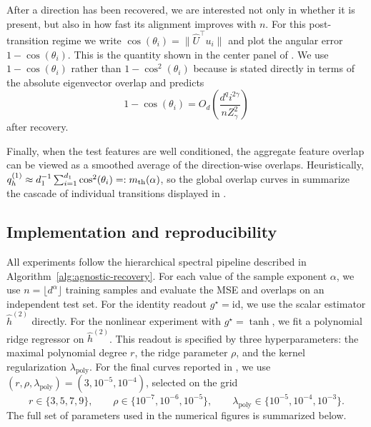 \documentclass[]{article}
\numberwithin{equation}{section}
\theoremstyle{definition}
\begin{document}
After a direction has been recovered, we are interested not only in whether it is present, but also in how fast its alignment improves with $n$. For this post-transition regime we write $\cos(\theta_i)=\|\widehat U^\top u_i\|$ and plot the angular error $1-\cos(\theta_i)$. This is the quantity shown in the center panel of . We use $1-\cos(\theta_i)$ rather than $1-\cos^2(\theta_i)$ because  is stated directly in terms of the absolute eigenvector overlap and predicts
\begin{equation}
    1-\cos(\theta_i)
    =
    O_d\left(\frac{d^q i^{2\gamma}}{nZ_\gamma^2}\right)
\end{equation}
after recovery. 

Finally, when the test features are well conditioned, the aggregate feature overlap can be viewed as a smoothed average of the direction-wise overlaps. Heuristically,
$q_h^{(1)}\approx d_1^{-1}\sum_{i=1}^{d_1}\cos^2(\theta_i)=:m_{\rm th}(\alpha)$, so the global overlap curves in  summarize the cascade of individual transitions displayed in .

\subsection{Implementation and reproducibility}
\label{app:implementation}


All experiments follow the hierarchical spectral pipeline described in Algorithm~\ref{alg:agnostic-recovery}. 
For each value of the sample exponent $\alpha$, we use $n=\lfloor d^\alpha\rfloor$ training samples and evaluate the MSE and overlaps on an independent test set. 
For the identity readout $g^\star=\mathrm{id}$, we use the scalar estimator $\widehat h^{(2)}$ directly. 
For the nonlinear experiment with $g^\star=\tanh$, we fit a polynomial ridge regressor on $\widehat h^{(2)}$. 
This readout is specified by three hyperparameters: the maximal polynomial degree $r$, the ridge parameter $\rho$, and the kernel regularization $\lambda_{\mathrm{poly}}$.
For the final curves reported in , we use $(r,\rho,\lambda_{\mathrm{poly}})=(3,10^{-5},10^{-4})$, selected on the grid
\[
r\in\{3,5,7,9\}, \qquad
\rho\in\{10^{-7},10^{-6},10^{-5}\}, \qquad
\lambda_{\mathrm{poly}}\in\{10^{-5},10^{-4},10^{-3}\}.
\]
The full set of parameters used in the numerical figures is summarized below.
\end{document}
